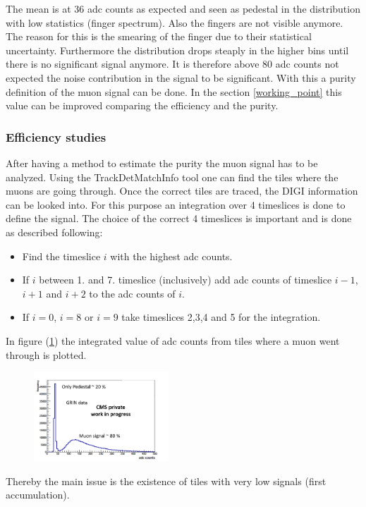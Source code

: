 			The mean is at 36 adc counts as expected and seen as pedestal in the distribution with low statistics (finger spectrum).
			Also the fingers are not visible anymore.
			The reason for this is the smearing of the finger due to their statistical uncertainty.
			Furthermore the distribution drops steaply in the higher bins until there is no significant signal anymore.
			It is therefore above 80 adc counts not expected the noise contribution in the signal to be significant.
			With this a purity definition of the muon signal can be done.
			In the section \ref{working_point} this value can be improved comparing the efficiency and the purity.
		\subsubsection{Efficiency studies}
			After having a method to estimate the purity the muon signal has to be analyzed.
			Using the TrackDetMatchInfo tool one can find the tiles where the muons are going through.
			Once the correct tiles are traced, the DIGI information can be looked into.
			For this purpose an integration over 4 timeslices is done to define the signal.
			The choice of the correct 4 timeslices is important and is done as described following:
			\begin{itemize}
			  \item Find the timeslice $i$ with the highest adc counts.
			  \item If $i$ between 1. and 7. timeslice (inclusively) add adc counts of timeslice $i-1$, $i+1$ and $i+2$ to the adc counts of $i$.
			  \item If $i=0$, $i=8$ or $i=9$ take timeslices 2,3,4 and 5 for the integration.
			\end{itemize}
			In figure (\ref{fig:efficiency1x1}) the integrated value of adc counts from tiles where a muon went through is plotted.
			\begin{figure}[htbp]
				\centering
				\includegraphics[width=0.45\textwidth]{Figures/erdogan/efficiency1x1.png}
				\caption{}
				\label{fig:efficiency1x1}
			\end{figure}
			Thereby the main issue is the existence of tiles with very low signals (first accumulation).
